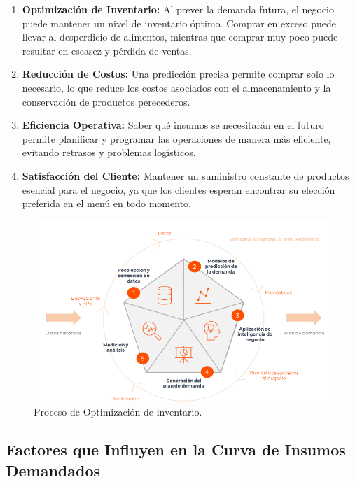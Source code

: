 \begin{enumerate}
  \item \textbf{Optimización de Inventario:} Al prever la demanda futura, el negocio puede mantener un nivel de inventario óptimo. Comprar en exceso puede llevar al desperdicio de alimentos, mientras que comprar muy poco puede resultar en escasez y pérdida de ventas.
  
  \item \textbf{Reducción de Costos:} Una predicción precisa permite comprar solo lo necesario, lo que reduce los costos asociados con el almacenamiento y la conservación de productos perecederos.
  
  \item \textbf{Eficiencia Operativa:} Saber qué insumos se necesitarán en el futuro permite planificar y programar las operaciones de manera más eficiente, evitando retrasos y problemas logísticos.
  
  \item \textbf{Satisfacción del Cliente:} Mantener un suministro constante de productos esencial para el negocio, ya que los clientes esperan encontrar su elección preferida en el menú en todo momento.
\end{enumerate}

\begin{figure}[H]
  \begin{center}
    \includegraphics[scale=0.60]{./procesos_de_trabajo.png}
    \caption{Proceso de Optimización de inventario.}
    \label{fig:proceso_inventario}
  \end{center}
\end{figure}

\subsection{Factores que Influyen en la Curva de Insumos Demandados}

